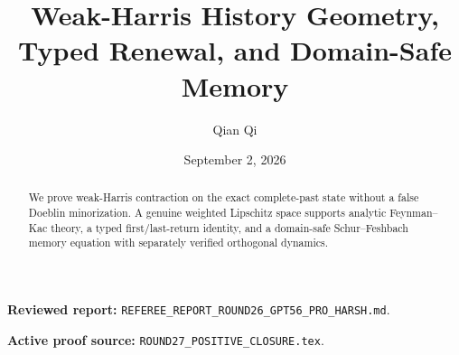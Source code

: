 \documentclass[11pt,reqno]{amsart}
\title[A4 Round 27 revision]{Weak-Harris History Geometry, Typed Renewal, and Domain-Safe Memory}
\author{Qian Qi}
\date{September 2, 2026}
\begin{document}
\begin{abstract}We prove weak-Harris contraction on the exact complete-past state without a false Doeblin minorization. A genuine weighted Lipschitz space supports analytic Feynman--Kac theory, a typed first/last-return identity, and a domain-safe Schur--Feshbach memory equation with separately verified orthogonal dynamics.\end{abstract}
\maketitle
\noindent\textbf{Reviewed report:} \texttt{REFEREE\_REPORT\_ROUND26\_GPT56\_PRO\_HARSH.md}.\par
\noindent\textbf{Active proof source:} \texttt{ROUND27\_POSITIVE\_CLOSURE.tex}.\par

\end{document}
